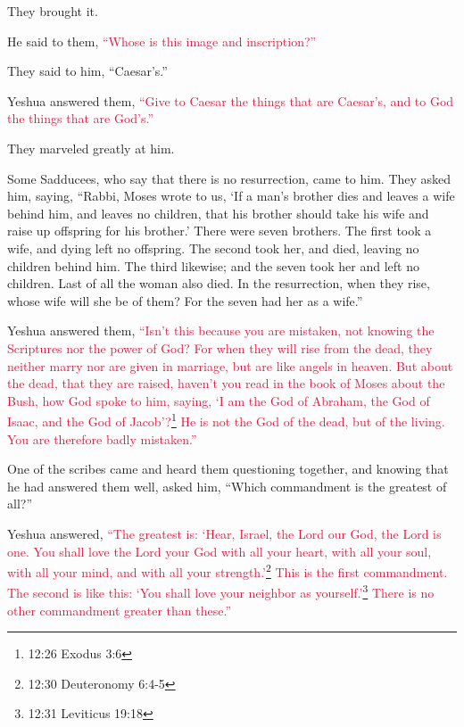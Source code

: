 \myverse{}They brought it.

He said to them,
\textcolor{crimson}{“Whose is this image and inscription?”}

They said to him, “Caesar’s.”

\myverse{}Yeshua answered them,
\textcolor{crimson}{“Give to Caesar the things that are Caesar’s, and to God the things that are God’s.”}

They marveled greatly at him.

\myverse{}Some Sadducees, who say that there is no resurrection, came
to him. They asked him, saying,
\myverse{}“Rabbi, Moses wrote to us, ‘If a man’s brother dies and leaves a wife behind
him, and leaves no children, that his brother should take his wife and raise up offspring for his brother.’
\myverse{}There were seven brothers. The first took a wife, and dying left no offspring.
\myverse{}The second took her, and died, leaving no children behind him. The third
likewise;
\myverse{}and the seven took her and left no children. Last of all the woman also died.
\myverse{}In the resurrection, when they rise, whose wife will she be of them? For
the seven had her as a wife.”

\myverse{}Yeshua answered them,
\textcolor{crimson}{“Isn’t this because you are mistaken, not knowing the Scriptures nor the power of God?
}
\myverse{}\textcolor{crimson}{For when they will rise from the dead, they neither marry nor are given
	in marriage, but are like angels in heaven.
}
\myverse{}\textcolor{crimson}{But about the dead, that they are raised, haven’t you read in the book
	of Moses about the Bush, how God spoke to him, saying, ‘I am the God of Abraham, the God of Isaac, and
	the God of Jacob’?}\footnote{12:26 Exodus 3:6}
\myverse{}\textcolor{crimson}{He is not the God of the dead, but of the living. You are therefore badly
	mistaken.”}

\myverse{}One of the scribes came and heard them questioning together,
and knowing that he had answered them well, asked him, “Which commandment is the greatest of all?”

\myverse{}Yeshua answered,
\textcolor{crimson}{“The greatest is: ‘Hear, Israel, the Lord our God, the Lord is one.
}
\myverse{}\textcolor{crimson}{You shall love the Lord your God with all your heart, with all your soul,
	with all your mind, and with all your strength.’}\footnote{12:30 Deuteronomy 6:4-5}
\textcolor{crimson}{This is the first commandment.
}
\myverse{}\textcolor{crimson}{The second is like this: ‘You shall love your neighbor as yourself.’}\footnote{12:31 Leviticus 19:18}
\textcolor{crimson}{There is no other commandment greater than these.”}

